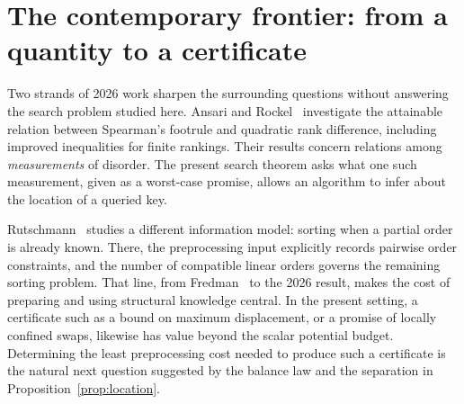 \documentclass[10pt,letterpaper]{article}
\begin{document}
\section{The contemporary frontier: from a quantity to a certificate}
Two strands of 2026 work sharpen the surrounding questions without answering
the search problem studied here. Ansari and Rockel~\cite{ansari} investigate the
attainable relation between Spearman's footrule and quadratic rank difference,
including improved inequalities for finite rankings. Their results concern
relations among \emph{measurements} of disorder. The present search theorem asks
what one such measurement, given as a worst-case promise, allows an algorithm
to infer about the location of a queried key.

Rutschmann~\cite{rutschmann} studies a different information model: sorting
when a partial order is already known. There, the preprocessing input explicitly
records pairwise order constraints, and the number of compatible linear orders
governs the remaining sorting problem. That line, from Fredman~\cite{fredman}
to the 2026 result, makes the cost of preparing and using structural knowledge
central. In the present setting, a certificate such as a bound on maximum
displacement, or a promise of locally confined swaps, likewise has value beyond
the scalar potential budget. Determining the least preprocessing cost needed to
produce such a certificate is the natural next question suggested by the
balance law and the separation in Proposition~\ref{prop:location}.
\end{document}
